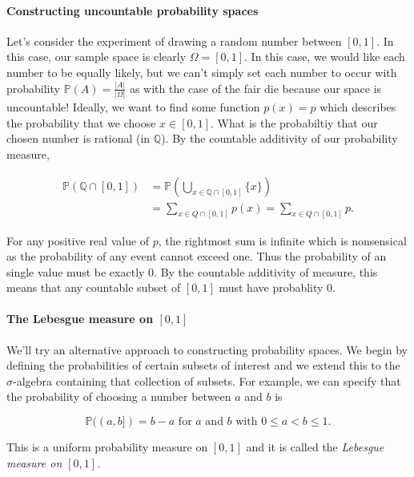 \documentclass[12pt]{article}
\newcommand{\bbQ}{\mathbb{Q}}
\newcommand{\Prob}{\mathbb{P}}
\newcommand{\abs}[1]{ \left| #1 \right| }
\theoremstyle{definition}
\theoremstyle{remark}
\numberwithin{equation}{section}
\begin{document}
\paragraph{Constructing uncountable probability spaces}%
\label{par:constructing_uncountable_probability_spaces}

Let's consider the experiment of drawing a random number between $[0,1]$. In this case, our sample space is clearly $\Omega = [0,1]$. In this case, we would like each number to be equally likely, but we can't simply set each number to occur with probability $\Prob(A) = \frac{\abs{A}}{\abs{\Omega}}$ as with the case of the fair die because our space is uncountable! Ideally, we want to find some function $p(x)=p$ which describes the probability that we choose $x\in[0,1]$. What is the probabiltiy that our chosen number is rational (in $\bbQ$). By the countable additivity of our probability measure, 

\begin{align}
  \Prob(\bbQ \cap [0,1]) &= \Prob \left( \bigcup_{ x\in \bbQ\cap[0,1]} \{x\} \right) \\ 
                         &= \sum_{x\in Q\cap[0,1]} p(x) = \sum_{x\in Q\cap[0,1]} p. 
\end{align}

For any positive real value of $p$, the rightmost sum is infinite which is nonsensical as the probability of any event cannot exceed one. Thus the probability of an single value must be exactly 0. By the countable additivity of measure, this means that any countable subset of $[0,1]$ must have probablity 0.

\paragraph{The Lebesgue measure on $[0,1]$} We'll try an alternative approach to constructing probability spaces. We begin by defining the probabilities of certain subsets of interest and we extend this to the $\sigma$-algebra containing that collection of subsets. For example, we can specify that the probability of choosing a number between $a$ and $b$ is 

\begin{equation}
  \Prob((a,b]) = b - a \text{ for $a$ and $b$ with } 0\leq a < b \leq 1.
\end{equation}

This is a uniform probability measure on $[0,1]$ and it is called the \emph{Lebesgue measure on $[0,1]$}.
\end{document}
